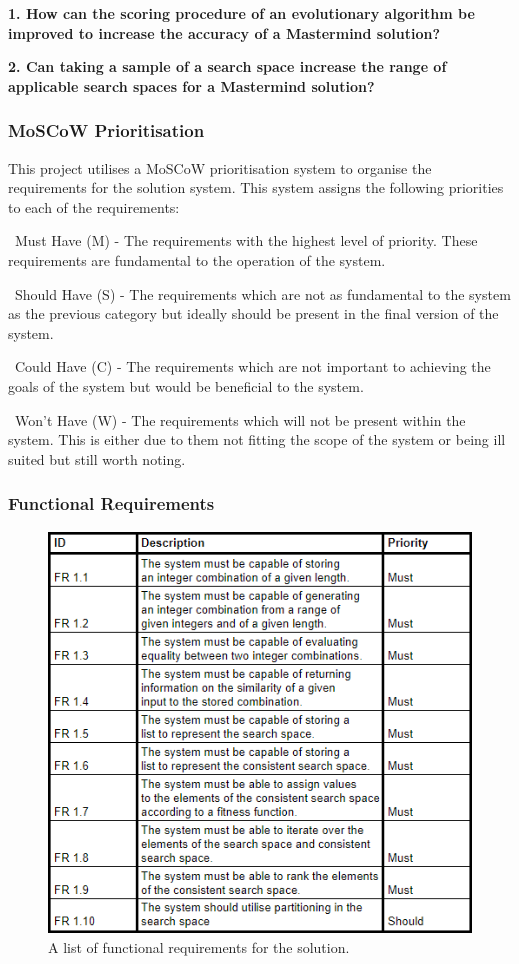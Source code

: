 \documentclass[11pt]{article}  %
\theoremstyle{definition}
\theoremstyle{remark}
\begin{document}
\textbf{1. How can the scoring procedure of an evolutionary algorithm be improved to increase the accuracy of a Mastermind solution?}

\textbf{2. Can taking a sample of a search space increase the range of applicable search spaces for a Mastermind solution?}

\subsubsection {MoSCoW Prioritisation}

This project utilises a MoSCoW prioritisation system to organise the requirements for the solution system. This system assigns the following priorities to each of the requirements:

\textbullet\ Must Have (M) - The requirements with the highest level of priority. These requirements are fundamental to the operation of the system.

\textbullet\ Should Have (S) - The requirements which are not as fundamental to the system as the previous category but ideally should be present in the final version of the system.

\textbullet\ Could Have (C) - The requirements which are not important to achieving the goals of the system but would be beneficial to the system.

\textbullet\ Won’t Have (W) - The requirements which will not be present within the system. This is either due to them not fitting the scope of the system or being ill suited but still worth noting.


\subsubsection {Functional Requirements}

\begin{figure}[H]
\centering
\caption[Short Heading]{A list of functional requirements for the solution.}
\includegraphics[scale=1]{Requirements}
\end{figure}
\end{document}
